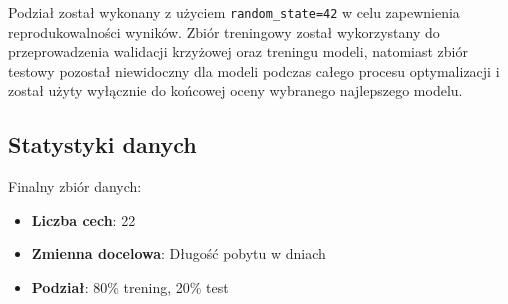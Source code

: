 Podział został wykonany z użyciem \texttt{random\_state=42} w celu zapewnienia reprodukowalności wyników. Zbiór treningowy został wykorzystany do przeprowadzenia walidacji krzyżowej oraz treningu modeli, natomiast zbiór testowy pozostał niewidoczny dla modeli podczas całego procesu optymalizacji i został użyty wyłącznie do końcowej oceny wybranego najlepszego modelu.

\subsection{Statystyki danych}

Finalny zbiór danych:
\begin{itemize}
    \item \textbf{Liczba cech}: 22
    \item \textbf{Zmienna docelowa}: Długość pobytu w dniach
    \item \textbf{Podział}: 80\% trening, 20\% test
\end{itemize}
